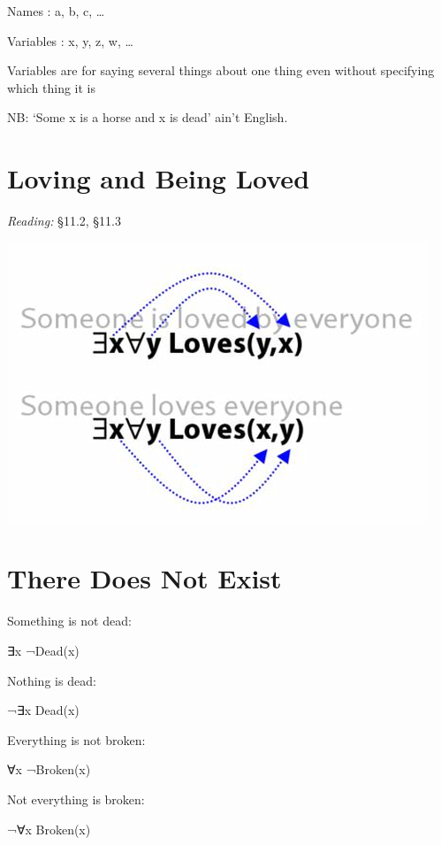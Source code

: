 \documentclass[12pt]{extarticle}
\begin{document}
\begin{multicols*}{3}
Names : a, b, c, …
 
Variables : x, y, z, w, …
 
Variables are for saying several things about one thing even without specifying which thing it is
 
NB: `Some x is a horse and x is dead' ain't English.
 
 \columnbreak
 
\section{Loving and Being Loved}
 
\emph{Reading:} §11.2, §11.3
 
\begin{center}
\includegraphics[scale=0.3]{img/unit_755_loved.png}
\end{center}
 
 
\section{There Does Not Exist}
 
Something is not dead:
 
\hspace{3mm} ∃x ¬Dead(x)
 
Nothing is dead:
 
\hspace{3mm} ¬∃x Dead(x)
 
Everything is not broken:
 
\hspace{3mm} ∀x ¬Broken(x)
 
Not everything is broken:
 
\hspace{3mm} ¬∀x Broken(x)
 

\end{multicols*}
\end{document}
